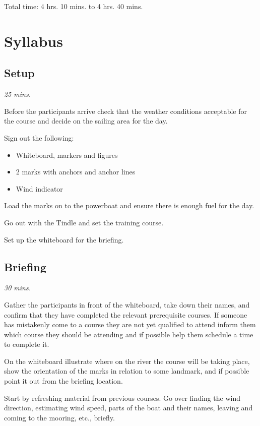 \documentclass[12pt]{scrartcl}
\begin{document}
Total time: 4 hrs. 10 mins. to 4 hrs. 40 mins.

\newpage

\section{Syllabus} \label{sec:syllabus}

\subsection{Setup} \label{subsec:setup}

{\small \textit{25 mins.}}

Before the participants arrive check that the weather conditions acceptable for the course and decide on the sailing area for the day.

Sign out the following:

\label{list:materials}
\begin{itemize}
	\item Whiteboard, markers and figures
	\item 2 marks with anchors and anchor lines
	\item Wind indicator
\end{itemize}

Load the marks on to the powerboat and ensure there is enough fuel for the day.

Go out with the Tindle and set the training course.

Set up the whiteboard for the briefing.

\subsection{Briefing} \label{subsec:briefing}

{\small \textit{30 mins.}}

Gather the participants in front of the whiteboard, take down their names, and confirm that they have completed the relevant prerequisite courses. If someone has mistakenly come to a course they are not yet qualified to attend inform them which course they should be attending and if possible help them schedule a time to complete it.

On the whiteboard illustrate where on the river the course will be taking place, show the orientation of the marks in relation to some landmark, and if possible point it out from the briefing location.

Start by refreshing material from previous courses. Go over finding the wind direction, estimating wind speed, parts of the boat and their names, leaving and coming to the mooring, etc., briefly.
\end{document}
